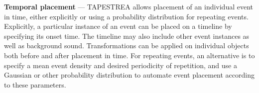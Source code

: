 \documentclass[review]{acmsiggraph}      %
\begin{document}
\textbf{Temporal placement} --- TAPESTREA allows placement of an individual event in time, either explicitly or using 
a probability distribution for repeating events.  
Explicitly, a particular instance of an event can be placed on a timeline by specifying its onset time. The timeline 
may also include other event instances as well as background sound. Transformations can be applied on individual 
objects both before and after placement in time. 
For repeating events, an alternative is to specify a mean event density and desired 
periodicity of repetition, and use a Gaussian or other probability distribution to automate 
event placement according to these parameters.



\end{document}
